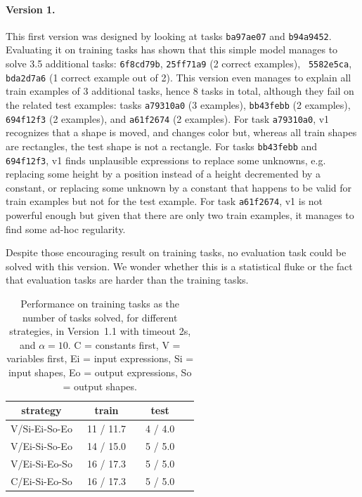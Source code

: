 \documentclass[a4paper]{llncs}
\begin{document}
\paragraph{Version 1.} This first version was designed by looking at
tasks {\tt ba97ae07} and {\tt b94a9452}. Evaluating it on training
tasks has shown that this simple model manages to solve 3.5 additional
tasks: {\tt 6f8cd79b}, {\tt 25ff71a9} (2 correct examples), {\tt
  5582e5ca}, {\tt bda2d7a6} (1 correct example out of 2). This version
even manages to explain all train examples of 3 additional tasks,
hence 8 tasks in total, although they fail on the related test
examples: tasks {\tt a79310a0} (3 examples), {\tt bb43febb} (2
examples), {\tt 694f12f3} (2 examples), and {\tt a61f2674} (2
examples). For task {\tt a79310a0}, v1 recognizes that a shape is
moved, and changes color but, whereas all train shapes are rectangles,
the test shape is not a rectangle. For tasks {\tt bb43febb} and {\tt
  694f12f3}, v1 finds unplausible expressions to replace some
unknowns, e.g. replacing some height by a position instead of a height
decremented by a constant, or replacing some unknown by a constant
that happens to be valid for train examples but not for the test
example. For task {\tt a61f2674}, v1 is not powerful enough but given
that there are only two train examples, it manages to find some ad-hoc
regularity.

Despite those encouraging result on training tasks, no evaluation task
could be solved with this version. We wonder whether this is a
statistical fluke or the fact that evaluation tasks are harder than
the training tasks.

\begin{table}[t]
  \centering
  \caption{Performance on training tasks as the number of tasks solved, for different strategies, in Version~1.1 with timeout 2s, and $\alpha=10$. C = constants first, V = variables first, Ei = input expressions, Si = input shapes, Eo = output expressions, So = output shapes.}
  \begin{tabular}{|c|c|c|c|}
    \hline
    strategy & train & test \\
    \hline
    V/Si-Ei-So-Eo & ~11 / 11.7~ & ~4 / 4.0~ \\
    V/Ei-Si-So-Eo & ~14 / 15.0~ & ~5 / 5.0~ \\
    V/Ei-Si-Eo-So & ~16 / 17.3~ & ~5 / 5.0~ \\
    C/Ei-Si-Eo-So & ~16 / 17.3~ & ~5 / 5.0~ \\
    \hline
  \end{tabular}
  \label{tab:v11:strategies}
\end{table}
\end{document}
